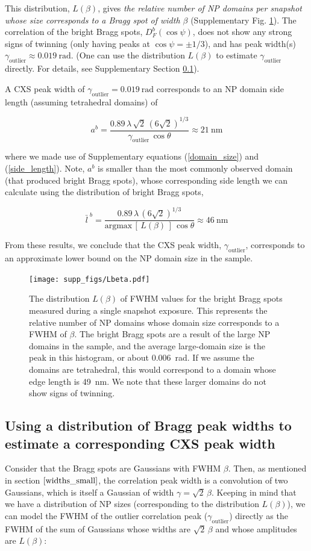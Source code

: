 \documentclass [12pt,fleqn]{article}
\def \be {\begin{equation}}
\def \ee {\end{equation}}
\begin{document}
This distribution, $L(\beta)$, gives \emph{the relative number of NP domains per snapshot whose size corresponds to a Bragg spot of width $\beta$} (Supplementary Fig. \ref{fig:Lbeta}). The correlation of the bright Bragg spots, $D^b_F(\cos \psi)$,  does not show any strong signs of twinning (only having peaks at $\cos \psi = \pm 1/3$), and has peak width(s) $\gamma_{\text{outlier}} \approx \SI{0.019}{\radian}$. (One can use the distribution $L(\beta)$ to estimate $\gamma_{\text{outlier}}$ directly. For details, see Supplementary Section \ref{bragg_to_cxs}). 

A CXS peak width of $\gamma_{\text{outlier}} = \SI{0.019}{\radian}$ corresponds to an NP domain side length (assuming tetrahedral domains) of

\be
a^b = \frac{0.89\, \lambda \, \sqrt{2}\,( 6 \sqrt{2} )^{1/3} }{\gamma_{\text{outlier}} \,\cos \theta}  \approx \SI{21}{\nm}
\ee

where we made use of Supplementary equations (\ref{domain_size}) and (\ref{side_length}). Note, $a^b$ is smaller than the most commonly observed domain (that produced bright Bragg spots), whose corresponding side length we can calculate using the distribution of bright Bragg spots, 

\be
\bar{l}^{\,\,b} = \frac{0.89\, \lambda \,( 6 \sqrt{2} )^{1/3} }{ \text{argmax}\, [\,L(\beta)\,] \,\cos \theta} \approx \SI{46}{\nm}
\ee

From these results, we conclude that the CXS peak width, $\gamma_{\text{outlier}}$, corresponds to an approximate lower bound on the NP domain size in the sample.

\begin{figure}[H]
\texttt{[image: supp\_figs/Lbeta.pdf]}
\caption{The distribution $L(\beta)$ of FWHM values for the bright Bragg spots measured during a single snapshot exposure. This represents the relative number of NP domains whose domain size corresponds to a FWHM of $\beta$. The bright Bragg spots are a result of the large NP domains in the sample, and the average large-domain size is the peak in this histogram, or about \SI{0.006}{\radian}. If we assume the domains are tetrahedral, this would correspond to a domain whose edge length is \SI{49}{\nm}. We note that these larger domains do not show signs of twinning.}
\label{fig:Lbeta}
\end{figure}

\subsection{Using a distribution of Bragg peak widths to estimate a corresponding CXS peak width} \label{bragg_to_cxs}
Consider that the Bragg spots are Gaussians with FWHM $\beta$. Then, as mentioned in section $\ref{widths_small}$, the correlation peak width is a convolution of two Gaussians, which is itself a Gaussian of width $\gamma = \sqrt{2}\,\beta$. Keeping in mind that we have a distribution of NP sizes (corresponding to the distribution $L(\beta)$), we can model the FWHM of the outlier correlation peak ($\gamma_{\text{outlier}}$) directly as the FWHM of the sum of Gaussians whose widths are $\sqrt{2}\,\beta$ and whose amplitudes are $L(\beta)$:
\end{document}
